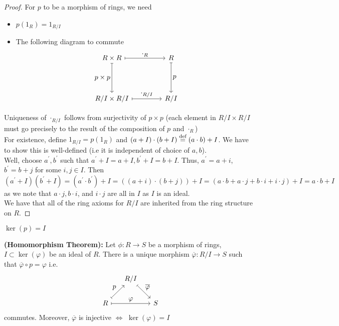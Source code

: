 \begin{proof}
    For $p$ to be a morphism of rings, we need
    \begin{itemize}
        \item $p(1_R) = 1_{R/I}$
        \item The following diagram to commute
        \[ \begin{tikzcd}[%
        ,every arrow/.append style={maps to}
        ,every label/.append style={font=\normalsize}
        ,row sep=1.5cm
        ,column sep=1.5cm]
        R \times R \arrow{r}{\cdot_R} \arrow[swap]{d}{p \times p} & R \arrow{d}{p} \\%
        R/I \times R/I \arrow{r}{\cdot_{R/I}}& R/I
        \end{tikzcd}
        \]
    \end{itemize}
    Uniqueness of $\cdot_{R/I}$ follows from surjectivity of $p \times p$ (each element
    in $R / I \times R/I$ must go precisely to the result of the composition of $p$ and
    $\cdot_R$) \\
    For existence, define $1_{R/I} = p(1_R)$ and $(a + I) \cdot (b + I) \overset{\textrm{def}}{=} (a \cdot b) + I$.
    We have to show this is well-defined (i.e it is independent of choice of $a, b$). \\
    Well, choose $a^\prime, b^\prime$ such that $a^\prime  + I = a + I, b^\prime + I = b + I$.
    Thus, $a^\prime = a + i$, $b^\prime = b + j$ for some $i, j \in I$. Then
    $$
    (a^\prime + I)(b^\prime + I) = (a^\prime \cdot b^\prime) + I = ((a + i)\cdot(b + j)) + I =
    (a\cdot b + a \cdot j + b \cdot i + i \cdot j) + I = a\cdot b + I
    $$
    as we note that $a \cdot j, b \cdot i$, and $i \cdot j$ are all in $I$ as $I$
    is an ideal. \\
    We have that all of the ring axioms for $R / I$ are inherited from the ring
    structure on $R$.
\end{proof}
\begin{rmk}
    $\ker(p) = I$
\end{rmk}
\begin{thm}\label{thm:homomorphism} \textbf{(Homomorphism Theorem):}
    Let $\phi: R \rightarrow S$ be a morphism of rings, $I \subset \ker(\varphi)$ be
    an ideal of $R$. There is a unique morphism $\overline{\varphi}: R/I \rightarrow S$
    such that $\overline{\varphi} \circ p = \varphi$ i.e.
    \[
\begin{tikzcd}[,every arrow/.append style={maps to}
,every label/.append style={font=\normalsize},column sep=1.5em]
 & R/I \arrow{dr}{\overline{\varphi}} \\
R \arrow{ur}{p} \arrow{rr}{\varphi} && S
\end{tikzcd}
\]
commutes. Moreover, $\overline{\varphi}$ is injective $\iff$ $\ker(\varphi) = I$
\end{thm}
